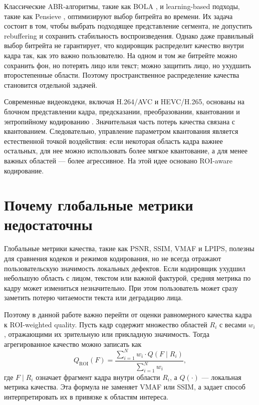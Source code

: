 \documentclass[12pt,a4paper,oneside,openany]{report}
\newcommand{\roi}{\mathrm{ROI}}
\begin{document}
Классические ABR-алгоритмы, такие как BOLA \cite{bola}, и learning-based подходы, такие как Pensieve \cite{pensieve}, оптимизируют выбор битрейта во времени. Их задача состоит в том, чтобы выбрать подходящее представление сегмента, не допустить rebuffering и сохранить стабильность воспроизведения. Однако даже правильный выбор битрейта не гарантирует, что кодировщик распределит качество внутри кадра так, как это важно пользователю. На одном и том же битрейте можно сохранить фон, но потерять лицо или текст; можно защитить лицо, но ухудшить второстепенные области. Поэтому пространственное распределение качества становится отдельной задачей.

Современные видеокодеки, включая H.264/AVC и HEVC/H.265, основаны на блочном представлении кадра, предсказании, преобразовании, квантовании и энтропийному кодированию \cite{h264,hevc,vatolin,itmo_compression}. Значительная часть потерь качества связана с квантованием. Следовательно, управление параметром квантования является естественной точкой воздействия: если некоторая область кадра важнее остальных, для нее можно использовать более мягкое квантование, а для менее важных областей --- более агрессивное. На этой идее основано ROI-aware кодирование.

\section{Почему глобальные метрики недостаточны}

Глобальные метрики качества, такие как PSNR, SSIM, VMAF и LPIPS, полезны для сравнения кодеков и режимов кодирования, но не всегда отражают пользовательскую значимость локальных дефектов. Если кодировщик ухудшил небольшую область с лицом, текстом или важной фактурой, средняя метрика по кадру может измениться незначительно. При этом пользователь может сразу заметить потерю читаемости текста или деградацию лица.

Поэтому в данной работе важно перейти от оценки равномерного качества кадра к ROI-weighted quality. Пусть кадр содержит множество областей $R_i$ с весами $w_i$, отражающими их зрительную или прикладную значимость. Тогда агрегированное качество можно записать как
\begin{equation}Q_{\roi}(F) =\frac{\sum_{i=1}^{N} w_i \cdot Q(F\mid R_i)}{\sum_{i=1}^{N} w_i},\label{eq:roi_quality}
\end{equation}где $F\mid R_i$ означает фрагмент кадра внутри области $R_i$, а $Q(\cdot)$ --- локальная метрика качества. Эта формула не заменяет VMAF или SSIM, а задает способ интерпретировать их в привязке к областям интереса.
\end{document}
